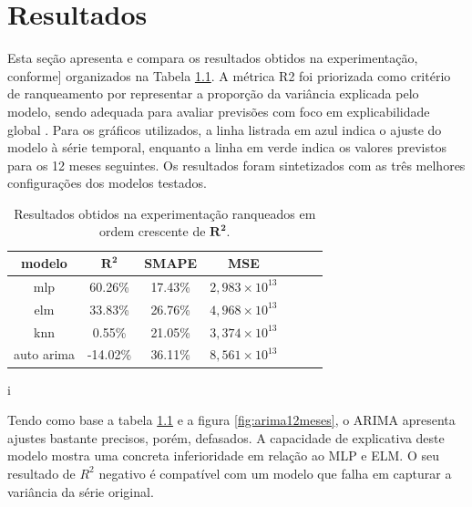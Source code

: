 \documentclass[12pt]{tcc}
\begin{document}
\chapter{Resultados}
\label{sec:resultados}

Esta seção apresenta e compara os resultados obtidos na experimentação, conforme] organizados na Tabela \ref{tab:tabela_resultados}. A métrica \gls{R2} foi priorizada como critério de ranqueamento por representar a proporção da variância explicada pelo modelo, sendo adequada para avaliar previsões com foco em explicabilidade global \citep{chicco_coefficient_2021}. Para os gráficos utilizados, a linha listrada em azul indica o ajuste do modelo à série temporal, enquanto a linha em verde indica os valores previstos para os 12 meses seguintes. Os resultados foram sintetizados com as três melhores configurações dos modelos testados.

\begin{table}[!ht]
    \centering
    \caption{Resultados obtidos na experimentação ranqueados em ordem crescente de $\boldsymbol{R^2}$.}
    \begin{tabular}{c c c c c c c}
         \textbf{modelo} & $\boldsymbol{R^2}$ & \textbf{SMAPE} & \textbf{MSE} \\
        \hline
        mlp & 60.26\% & 17.43\% & $2{,}983\times10^{13}$ 
        \\ 
        elm & 33.83\% & 26.76\% & $4{,}968\times10^{13}$  
        \\
        knn & 0.55\% & 21.05\% & $3{,}374\times10^{13}$  
        \\
        auto arima & -14.02\% & 36.11\% & $8{,}561\times10^{13}$
        \\
        \hline
    \end{tabular}i
    \label{tab:tabela_resultados}
\end{table}

Tendo como base a tabela \ref{tab:tabela_resultados} e a figura \ref{fig:arima12meses}, o ARIMA apresenta ajustes bastante precisos, porém, defasados. A capacidade de explicativa deste modelo mostra uma concreta inferioridade em relação ao MLP e ELM. O seu resultado de $R^2$ negativo é compatível com um modelo que falha em capturar a variância da série original.
\end{document}
